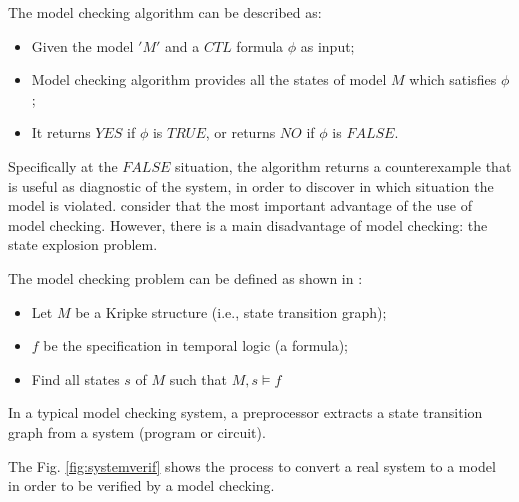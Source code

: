 \documentclass[journal]{IEEEtran}
\begin{document}
The model checking algorithm can be described as:  

\begin{itemize}
\item Given the model $ 'M' $ and a $CTL$ formula $ \phi $ as input;  
\item Model checking algorithm provides all the states of model $ M $ which satisfies $ \phi $;  
\item It returns $YES$ if $ \phi $ is $TRUE$, or returns $NO$ if $ \phi $ is $FALSE$.  

\end{itemize}
Specifically at the $FALSE$ situation, the algorithm returns a counterexample that is useful as diagnostic of the system, in order to discover in which situation the model is violated. \cite{Clarke2008} consider that the most important advantage of the use of model checking. 
However, there is a main disadvantage of model checking: the state explosion problem. 

The model checking problem can be defined as shown in \cite{Clarke2008}: 

\begin{itemize}
\item Let $M$ be a Kripke structure (i.e., state transition graph);
\item $f$ be the specification in temporal logic (a formula);
\item Find all states $s$ of $M$ such that $M , s \models f$
\end{itemize}

In a typical model checking system, a preprocessor extracts a state transition graph from a system (program or circuit).

%
%
The Fig. \ref{fig:systemverif} shows the process to convert a real system to a model in order to be verified by a model checking. 
\end{document}
